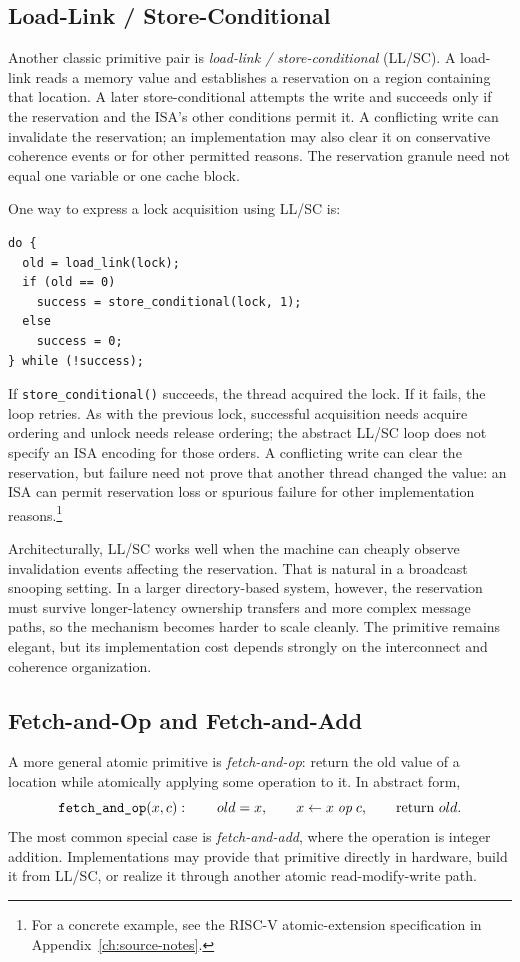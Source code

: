 

\subsection*{Load-Link / Store-Conditional}
Another classic primitive pair is \textit{load-link / store-conditional} (LL/SC).
A load-link reads a memory value and establishes a reservation on a region containing that location.
A later store-conditional attempts the write and succeeds only if the reservation and the ISA's other conditions permit it.
A conflicting write can invalidate the reservation; an implementation may also clear it on conservative coherence events or for other permitted reasons.
The reservation granule need not equal one variable or one cache block.

One way to express a lock acquisition using LL/SC is:
\begin{verbatim}
do {
  old = load_link(lock);
  if (old == 0)
    success = store_conditional(lock, 1);
  else
    success = 0;
} while (!success);
\end{verbatim}
If \texttt{store\_conditional()} succeeds, the thread acquired the lock.
If it fails, the loop retries.
As with the previous lock, successful acquisition needs acquire ordering and unlock needs release ordering; the abstract LL/SC loop does not specify an ISA encoding for those orders.
A conflicting write can clear the reservation, but failure need not prove that another thread changed the value: an ISA can permit reservation loss or spurious failure for other implementation reasons.\footnote{For a concrete example, see the RISC-V atomic-extension specification in Appendix~\ref{ch:source-notes}.}

Architecturally, LL/SC works well when the machine can cheaply observe invalidation events affecting the reservation.
That is natural in a broadcast snooping setting.
In a larger directory-based system, however, the reservation must survive longer-latency ownership transfers and more complex message paths, so the mechanism becomes harder to scale cleanly.
The primitive remains elegant, but its implementation cost depends strongly on the interconnect and coherence organization.

\subsection*{Fetch-and-Op and Fetch-and-Add}
A more general atomic primitive is \textit{fetch-and-op}: return the old value of a location while atomically applying some operation to it.
In abstract form,
\begin{equation}\label{eq:ch9-formula-fetchop}
    \text{\texttt{fetch\_and\_op}}(x,c):\qquad old=x,\qquad x\leftarrow x\;\textit{op}\;c,\qquad \text{return } old.
\end{equation}
The most common special case is \textit{fetch-and-add}, where the operation is integer addition.
Implementations may provide that primitive directly in hardware, build it from LL/SC, or realize it through another atomic read-modify-write path.

